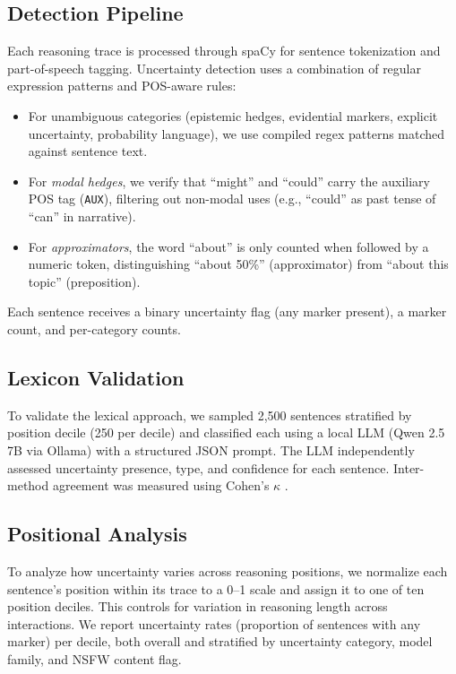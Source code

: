 \subsection{Detection Pipeline}

Each reasoning trace is processed through spaCy \citep{honnibal2020spacy} for sentence tokenization and part-of-speech tagging. Uncertainty detection uses a combination of regular expression patterns and POS-aware rules:

\begin{itemize}
    \item For unambiguous categories (epistemic hedges, evidential markers, explicit uncertainty, probability language), we use compiled regex patterns matched against sentence text.
    \item For \emph{modal hedges}, we verify that ``might'' and ``could'' carry the auxiliary POS tag (\texttt{AUX}), filtering out non-modal uses (e.g., ``could'' as past tense of ``can'' in narrative).
    \item For \emph{approximators}, the word ``about'' is only counted when followed by a numeric token, distinguishing ``about 50\%'' (approximator) from ``about this topic'' (preposition).
\end{itemize}

Each sentence receives a binary uncertainty flag (any marker present), a marker count, and per-category counts.

\subsection{Lexicon Validation}
\label{sec:validation}

To validate the lexical approach, we sampled 2,500 sentences stratified by position decile (250 per decile) and classified each using a local LLM (Qwen 2.5 7B via Ollama) with a structured JSON prompt. The LLM independently assessed uncertainty presence, type, and confidence for each sentence. Inter-method agreement was measured using Cohen's $\kappa$ \citep{cohen1960coefficient}.



\subsection{Positional Analysis}

To analyze how uncertainty varies across reasoning positions, we normalize each sentence's position within its trace to a 0--1 scale and assign it to one of ten position deciles. This controls for variation in reasoning length across interactions. We report uncertainty rates (proportion of sentences with any marker) per decile, both overall and stratified by uncertainty category, model family, and NSFW content flag.

